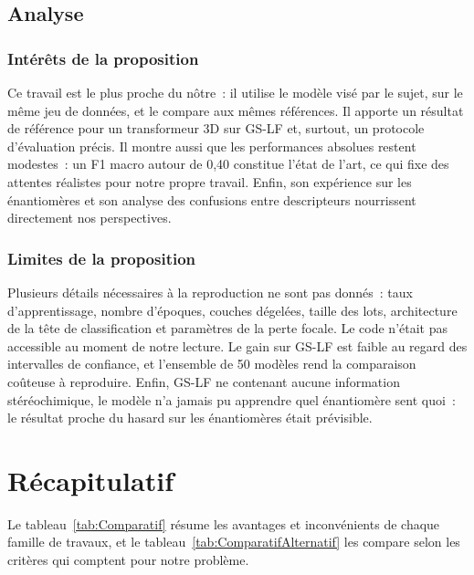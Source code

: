 \subsection{Analyse}

\subsubsection{Intérêts de la proposition}

Ce travail est le plus proche du nôtre~: il utilise le modèle visé par le sujet, sur le même jeu de données, et le compare aux mêmes références.
Il apporte un résultat de référence pour un transformeur 3D sur GS-LF et, surtout, un protocole d'évaluation précis.
Il montre aussi que les performances absolues restent modestes~: un F1 macro autour de 0,40 constitue l'état de l'art, ce qui fixe des attentes réalistes pour notre propre travail.
Enfin, son expérience sur les énantiomères et son analyse des confusions entre descripteurs nourrissent directement nos perspectives.

\subsubsection{Limites de la proposition}

Plusieurs détails nécessaires à la reproduction ne sont pas donnés~: taux d'apprentissage, nombre d'époques, couches dégelées, taille des lots, architecture de la tête de classification et paramètres de la perte focale.
Le code n'était pas accessible au moment de notre lecture.
Le gain sur GS-LF est faible au regard des intervalles de confiance, et l'ensemble de 50 modèles rend la comparaison coûteuse à reproduire.
Enfin, GS-LF ne contenant aucune information stéréochimique, le modèle n'a jamais pu apprendre quel énantiomère sent quoi~: le résultat proche du hasard sur les énantiomères était prévisible.


\section{Récapitulatif}
\label{sec:Recapitulatif}

Le tableau~\ref{tab:Comparatif} résume les avantages et inconvénients de chaque famille de travaux, et le tableau~\ref{tab:ComparatifAlternatif} les compare selon les critères qui comptent pour notre problème.

